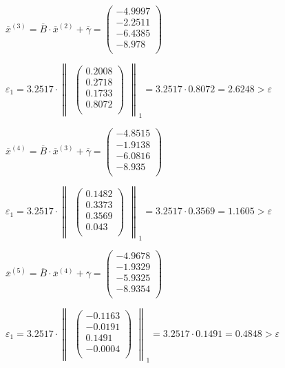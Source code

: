 \documentclass[10pt, a4paper]{scrartcl}
\begin{document}
\(\overline{x}^{(3)} = \overline{B} \cdot \overline{x}^{(2)} + \overline{\gamma} = \begin{pmatrix} -4.9997\\ -2.2511\\ -6.4385\\ -8.978\\ \end{pmatrix}\)

\(\varepsilon_1 = 3.2517 \cdot \begin{Vmatrix}\begin{pmatrix} 0.2008\\ 0.2718\\ 0.1733\\ 0.8072\\ \end{pmatrix}\end{Vmatrix} _1 = 3.2517 \cdot 0.8072 = 2.6248 > \varepsilon\)

\(\overline{x}^{(4)} = \overline{B} \cdot \overline{x}^{(3)} + \overline{\gamma} = \begin{pmatrix} -4.8515\\ -1.9138\\ -6.0816\\ -8.935\\ \end{pmatrix}\)

\(\varepsilon_1 = 3.2517 \cdot \begin{Vmatrix}\begin{pmatrix} 0.1482\\ 0.3373\\ 0.3569\\ 0.043\\ \end{pmatrix}\end{Vmatrix} _1 = 3.2517 \cdot 0.3569 = 1.1605 > \varepsilon\)

\(\overline{x}^{(5)} = \overline{B} \cdot \overline{x}^{(4)} + \overline{\gamma} = \begin{pmatrix} -4.9678\\ -1.9329\\ -5.9325\\ -8.9354\\ \end{pmatrix}\)

\(\varepsilon_1 = 3.2517 \cdot \begin{Vmatrix}\begin{pmatrix} -0.1163\\ -0.0191\\ 0.1491\\ -0.0004\\ \end{pmatrix}\end{Vmatrix} _1 = 3.2517 \cdot 0.1491 = 0.4848 > \varepsilon\)
\end{document}
